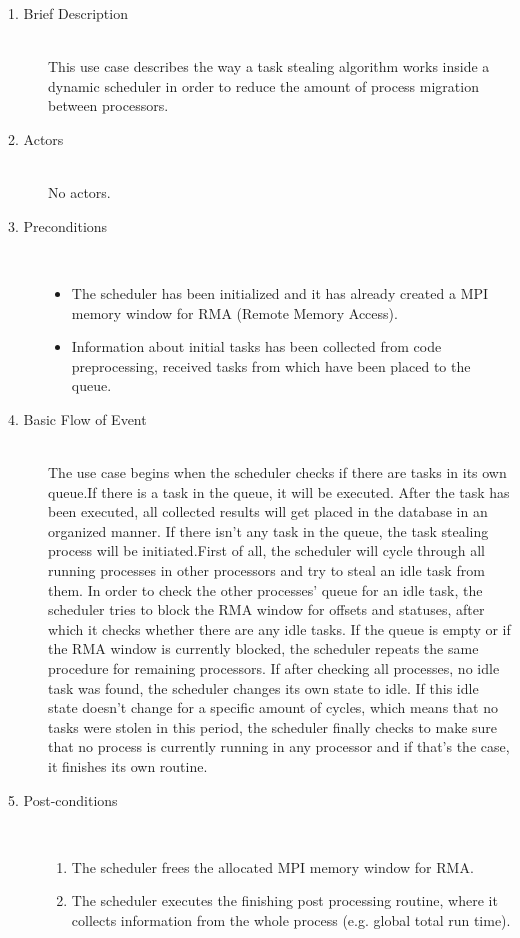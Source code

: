 \begin{description}
	\item [1. Brief Description]\hfill \\
	This use case describes the way a task stealing algorithm works inside a dynamic scheduler in order to reduce the amount of process migration between processors.
	
	\item [2. Actors]\hfill \\
	No actors. 
	
	
	\item [3. Preconditions]\hfill \\
	\vspace{-6.5mm}
	\begin{itemize}
		\item The scheduler has been initialized and it has already created a MPI memory window for RMA (Remote Memory Access).
		\item Information about initial tasks has been collected from code preprocessing, received tasks from which have been placed to the queue.
	\end{itemize}
	
	\item [4. Basic Flow of Event]\hfill \\
	The use case begins when the scheduler checks if there are tasks in its own queue.If there is a task in the queue, it will be executed. After the task has been executed, all collected results will get placed in the database in an organized manner.
	If there isn't any task in the queue, the task stealing process will be initiated.\newline First of all, the scheduler will cycle through all running processes in other processors and try to steal an idle task from them. In order to check the other processes' queue for an idle task, the scheduler tries to block the RMA window for offsets and statuses, after which it checks whether there are any idle tasks. If the queue is empty or if the RMA window is currently blocked, the scheduler repeats the same procedure for remaining processors. If after checking all processes, no idle task was found, the scheduler changes its own state to idle. If this idle state doesn't change for a specific amount of cycles, which means that no tasks were stolen in this period, the scheduler finally checks to make sure that no process is currently running in any processor and if that's the case, it finishes its own routine. 
	
	
	\item [5. Post-conditions]\hfill \\
	\vspace{-6.5mm}
	\begin{enumerate}
		\item The scheduler frees the allocated MPI memory window for RMA.
		\item The scheduler executes the finishing post processing routine, where it collects information from the whole process (e.g. global total run time).
	\end{enumerate}
	

\end{description}
